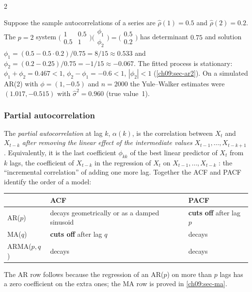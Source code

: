 \begin{paracol}{2}
\begin{example}\label{ch09:ex-yw}
Suppose the sample autocorrelations of a series are $\hat\rho(1)=0.5$ and $\hat\rho(2)=0.2$. The $p=2$ system
$\bigl(\begin{smallmatrix}1&0.5\\0.5&1\end{smallmatrix}\bigr)\bigl(\begin{smallmatrix}\phi_1\\\phi_2\end{smallmatrix}\bigr)
=\bigl(\begin{smallmatrix}0.5\\0.2\end{smallmatrix}\bigr)$ has determinant $0.75$ and solution
$\phi_1=(0.5-0.5\cdot0.2)/0.75=8/15\approx0.533$ and $\phi_2=(0.2-0.25)/0.75=-1/15\approx-0.067$. The fitted process is
stationary: $\phi_1+\phi_2=0.467<1$, $\phi_2-\phi_1=-0.6<1$, $|\phi_2|<1$ (\cref{ch09:sec-ar2}). On a simulated AR(2)
with $\phi=(1,-0.5)$ and $n=2000$ the Yule--Walker estimates were $(1.017,-0.515)$ with $\hat\sigma^2=0.960$
(true value~1).
\end{example}

\subsubsection{Partial autocorrelation}\label{ch09:sec-pacf}
The \emph{partial autocorrelation} at lag $k$, $\alpha(k)$, is the correlation between $X_t$ and $X_{t-k}$ \emph{after
removing the linear effect of the intermediate values} $X_{t-1},\dots,X_{t-k+1}$
. Equivalently, it is the last coefficient $\phi_{kk}$ of the best linear predictor of
$X_t$ from $k$ lags, the coefficient of $X_{t-k}$ in the regression of $X_t$ on $X_{t-1},\dots,X_{t-k}$
: the ``incremental correlation'' of adding one more lag. Together the ACF and PACF identify the
order of a model:
\begin{center}\small
\begin{tabular}{@{}lll@{}}
\toprule
 & ACF & PACF\\
\midrule
AR($p$) & decays geometrically or as a damped sinusoid & \textbf{cuts off} after lag $p$\\
MA($q$) & \textbf{cuts off} after lag $q$ & decays\\
ARMA($p,q$) & decays & decays\\
\bottomrule
\end{tabular}
\end{center}
The AR row follows because the regression of an AR($p$) on more than $p$ lags has a zero coefficient on the extra
ones; the MA row is proved in \cref{ch09:sec-ma}.


\end{paracol}
